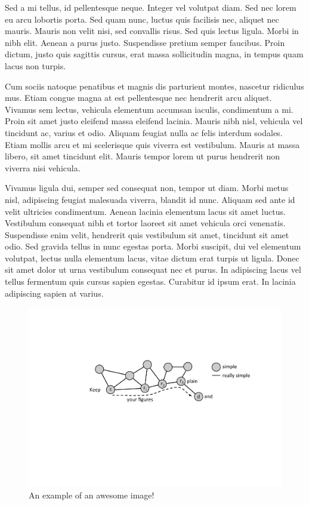 Sed a mi tellus, id pellentesque neque. Integer vel volutpat diam. Sed nec lorem eu arcu lobortis porta. Sed quam nunc, luctus quis facilisis nec, aliquet nec mauris. Mauris non velit nisi, sed convallis risus. Sed quis lectus ligula. Morbi in nibh elit. Aenean a purus justo. Suspendisse pretium semper faucibus. Proin dictum, justo quis sagittis cursus, erat massa sollicitudin magna, in tempus quam lacus non turpis.

Cum sociis natoque penatibus et magnis dis parturient montes, nascetur ridiculus mus. Etiam congue magna at est pellentesque nec hendrerit arcu aliquet. Vivamus sem lectus, vehicula elementum accumsan iaculis, condimentum a mi. Proin sit amet justo eleifend massa eleifend lacinia. Mauris nibh nisl, vehicula vel tincidunt ac, varius et odio. Aliquam feugiat nulla ac felis interdum sodales. Etiam mollis arcu et mi scelerisque quis viverra est vestibulum. Mauris at massa libero, sit amet tincidunt elit. Mauris tempor lorem ut purus hendrerit non viverra nisi vehicula.

Vivamus ligula dui, semper sed consequat non, tempor ut diam. Morbi metus nisl, adipiscing feugiat malesuada viverra, blandit id nunc. Aliquam sed ante id velit ultricies condimentum. Aenean lacinia elementum lacus sit amet luctus. Vestibulum consequat nibh et tortor laoreet sit amet vehicula orci venenatis. Suspendisse enim velit, hendrerit quis vestibulum sit amet, tincidunt sit amet odio. Sed gravida tellus in nunc egestas porta. Morbi suscipit, dui vel elementum volutpat, lectus nulla elementum lacus, vitae dictum erat turpis ut ligula. Donec sit amet dolor ut urna vestibulum consequat nec et purus. In adipiscing lacus vel tellus fermentum quis cursus sapien egestas. Curabitur id ipsum erat. In lacinia adipiscing sapien at varius.

\begin{figure}[t]
\centering
\includegraphics[width=1\columnwidth]{figures/example}
\caption{An example of an awesome image!}
\label{fig:example}
\end{figure} 


